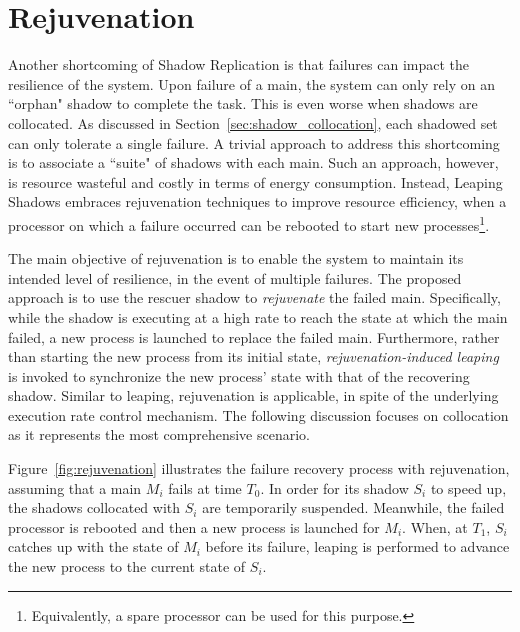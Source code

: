 \section{Rejuvenation}
\label{sec:rejuvenation}
Another shortcoming of Shadow Replication is that failures can impact the resilience of the system. 
Upon failure of a main, the system can only rely on an
``orphan" shadow to complete the task. 
This is even worse when shadows are collocated. As discussed in Section~\ref{sec:shadow_collocation}, each shadowed set can only tolerate a single failure. 
A trivial approach to
address this shortcoming is to associate a ``suite" of shadows
with each main. Such an approach, however, is resource
wasteful and costly in terms of energy consumption. Instead, Leaping Shadows embraces rejuvenation techniques to improve resource efficiency, when a processor on which a failure occurred can be rebooted to start new processes\footnote{Equivalently, a spare processor can be used for this purpose.}. %

The main objective of rejuvenation is to enable the
system to maintain its intended level of resilience, in the
event of multiple failures. The proposed approach is to use the rescuer shadow to \textit{rejuvenate} the failed main.  Specifically, while the shadow is executing at a high rate to reach the state at which the main failed, a new process is launched to replace the failed main. Furthermore, rather than starting the new process from its initial state, \textit{rejuvenation-induced leaping} is invoked to synchronize the new process' state with that of the recovering shadow. Similar to leaping, rejuvenation is applicable, in spite of the underlying execution rate control mechanism. The following discussion focuses on collocation as it represents the most comprehensive scenario. 


Figure~\ref{fig:rejuvenation} illustrates the failure recovery process with rejuvenation, assuming that a main $M_i$ fails at time $T_0$. 
In order for its shadow $S_i$ to speed up, the shadows collocated with $S_i$ are temporarily suspended. %
Meanwhile, the failed processor is rebooted and then a new process is launched for $M_i$. When, at $T_1$, $S_i$ catches up with the state of $M_i$ before its failure, leaping is performed to advance the new process to the current state of $S_i$. 

